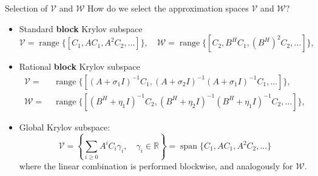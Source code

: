 \documentclass[aspectratio=169,xcolor=dvipsnames]{beamer}
\begin{document}
	\begin{frame}{Selection of $\mathcal{V}$ and $\mathcal{W}$}
	\faQuestionCircle\;How do we select the approximation spaces $\mathcal{V}$ and $\mathcal{W}$?
	\begin{itemize}
		\item[\faDoorOpen] Standard \textbf{block} Krylov subspace
		\[ \mathcal{V} = \operatorname{range}\{[C_1,AC_1,A^2C_2,\ldots] \}, \quad \mathcal{W} = \operatorname{range}\{[C_2,B^HC_1,(B^H)^2C_2,\ldots] \}, \]
		\item[\faDoorOpen] Rational \textbf{block} Krylov subspace
		\[ 
		\begin{split}
		\mathcal{V} = &\;\operatorname{range}\{[ (A+ \sigma_1 I)^{-1} C_1, (A+ \sigma_2 I)^{-1} (A+ \sigma_1 I)^{-1} C_1,\ldots] \}, \\ \mathcal{W} = &\; \operatorname{range}\{[ (B^H + \eta_1 I)^{-1} C_2, (B^H+ \eta_2 I)^{-1} (B^H+ \eta_1 I)^{-1} C_2,\ldots] \},
		\end{split}
		 \]
		 \item[\faDoorOpen] Global Krylov subspace:
		 \[
		 \mathcal{V} = \left\lbrace \sum_{i \geq 0} A^i C_i \gamma_i, \quad \gamma_i \in \mathbb{R} \right\rbrace = \operatorname{span}\{C_1,AC_1,A^2C_2,\ldots \}
		 \]
		 where the linear combination is performed blockwise, and analogously for $\mathcal{W}$.
	\end{itemize}
	\end{frame}
\end{document}
